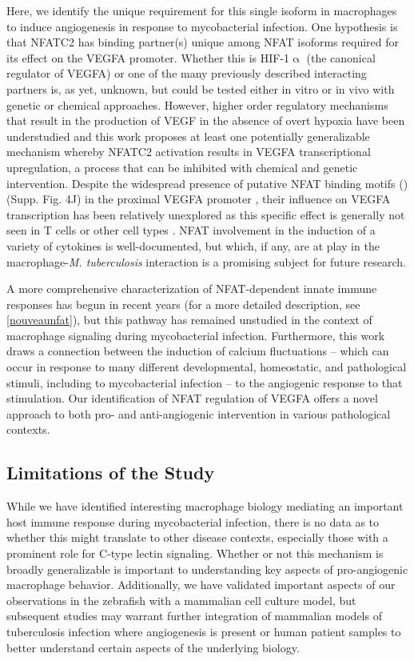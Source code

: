 Here, we identify the unique requirement for this single isoform in macrophages to induce angiogenesis in response to mycobacterial infection. One hypothesis is that NFATC2 has binding partner(s) unique among NFAT isoforms required for its effect on the VEGFA promoter. Whether this is HIF-1$\upalpha$ (the canonical regulator of VEGFA) or one of the many previously described interacting partners is, as yet, unknown, but could be tested either in vitro or in vivo with genetic or chemical approaches. However, higher order regulatory mechanisms that result in the production of VEGF in the absence of overt hypoxia have been understudied and this work proposes at least one potentially generalizable mechanism whereby NFATC2 activation results in VEGFA transcriptional upregulation, a process that can be inhibited with chemical and genetic intervention. Despite the widespread presence of putative NFAT binding motifs () (Supp. Fig. 4J) in the proximal VEGFA promoter \citep{Gearing2019}, their influence on VEGFA transcription has been relatively unexplored as this specific effect is generally not seen in T cells or other cell types \citep{Chang2004}. NFAT involvement in the induction of a variety of cytokines is well-documented, but which, if any, are at play in the macrophage-\textit{M. tuberculosis} interaction is a promising subject for future research. 

A more comprehensive characterization of NFAT-dependent innate immune responses has begun in recent years \citep{Deerhake2021, Peuker2022, Poli2022} (for a more detailed description, see \autoref{nouveaunfat}), but this pathway has remained unstudied in the context of macrophage signaling during mycobacterial infection. Furthermore, this work draws a connection between the induction of calcium fluctuations -- which can occur in response to many different developmental, homeostatic, and pathological stimuli, including to mycobacterial infection \citep{Kusner2001, Jayachandran2007, Jayachandran2008, Matty2019, Malik2000} -- to the angiogenic response to that stimulation. Our identification of NFAT regulation of VEGFA offers a novel approach to both pro- and anti-angiogenic intervention in various pathological contexts.

\subsection{Limitations of the Study}

While we have identified interesting macrophage biology mediating an important host immune response during mycobacterial infection, there is no data as to whether this might translate to other disease contexts, especially those with a prominent role for C-type lectin signaling. Whether or not this mechanism is broadly generalizable is important to understanding key aspects of pro-angiogenic macrophage behavior. Additionally, we have validated important aspects of our observations in the zebrafish with a mammalian cell culture model, but subsequent studies may warrant further integration of mammalian models of tuberculosis infection where angiogenesis is present or human patient samples to better understand certain aspects of the underlying biology.



